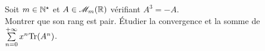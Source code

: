 Soit $m \in \mathbb{N}^\star$ et $A \in \mathscr{M}_m(\mathbb{R})$ vérifiant $A^3=-A$.\\
Montrer que son rang est pair. Étudier la convergence et la somme de $\sum\limits_{n=0}^{+\infty} x^n \mathrm{Tr} (A^n)$.